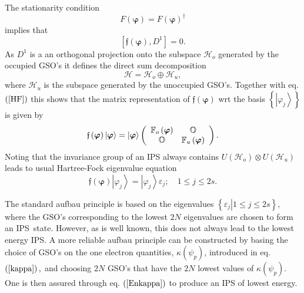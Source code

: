 \documentclass[titlepage]{article}%
\begin{document}
The stationarity condition
\begin{equation}
F\left(  \bm{\varphi}\right)  =F\left(  \bm{\varphi}\right)  ^{\dagger}%
\end{equation}
implies that
\begin{equation}
\left[  \mathfrak{f}\left(  \bm{\varphi}\right)  ,D^{1}\right]  =0. \label{HF}%
\end{equation}
As $D^{1}$ is a an orthogonal projection onto the subspace $\mathcal{H}_{o}$
generated by the occupied GSO's it defines the direct sum decomposition
\begin{equation}
\mathcal{H=H}_{o}\oplus\mathcal{H}_{u}, \label{DS}%
\end{equation}
where $\mathcal{H}_{u}$ is the subspace generated by the unoccupied GSO's.
Together with eq. $\left(  \ref{HF}\right)  $ this shows that the matrix
representation of $\mathfrak{f}\left(  \bm{\varphi}\right)  $ wrt the basis
$\left\{  \left\vert \varphi_{j}\right\rangle \right\}  $ is given by
\begin{equation}
\mathfrak{f}\left(  \bm{\varphi}\right)  \left\vert \bm{\varphi }\right\rangle
=\left\vert \bm{\varphi}\right\rangle \left(
\begin{array}
[c]{cc}%
\mathbb{F}_{o}\left(  \bm{\varphi}\right)  & \mathbb{O}\\
\mathbb{O} & \mathbb{F}_{u}\left(  \bm{\varphi}\right)
\end{array}
\right)  .
\end{equation}
Noting that the invariance group of an IPS always contains $U\left(
\mathcal{H}_{o}\right)  \otimes U\left(  \mathcal{H}_{u}\right)  $ leads to
usual Hartree-Fock eigenvalue equation
\begin{equation}
\mathfrak{f}\left(  \bm{\varphi}\right)  \left\vert \varphi_{j}\right\rangle
=\left\vert \varphi_{j}\right\rangle \varepsilon_{j};\quad1\leq j\leq2s.
\end{equation}


The standard aufbau principle is based on the eigenvalues $\left\{  \left.
\varepsilon_{j}\right\vert 1\leq j\leq2s\right\}  ,$ where the GSO's
corresponding to the lowest $2N$ eigenvalues are chosen to form an IPS\ state.
However, as is well known, this does not always lead to the lowest energy IPS.
A more reliable aufbau principle can be constructed by basing the choice of
GSO's on the one electron quantities, $\kappa\left(  \psi_{p}\right)  $,
introduced in eq. $\left(  \ref{kappa}\right)  ,$ and choosing $2N$ GSO's that
have the $2N$ lowest values of $\kappa\left(  \psi_{p}\right)  $. One is then
assured through eq. $\left(  \ref{Enkappa}\right)  $ to produce an IPS of
lowest energy.
\end{document}
